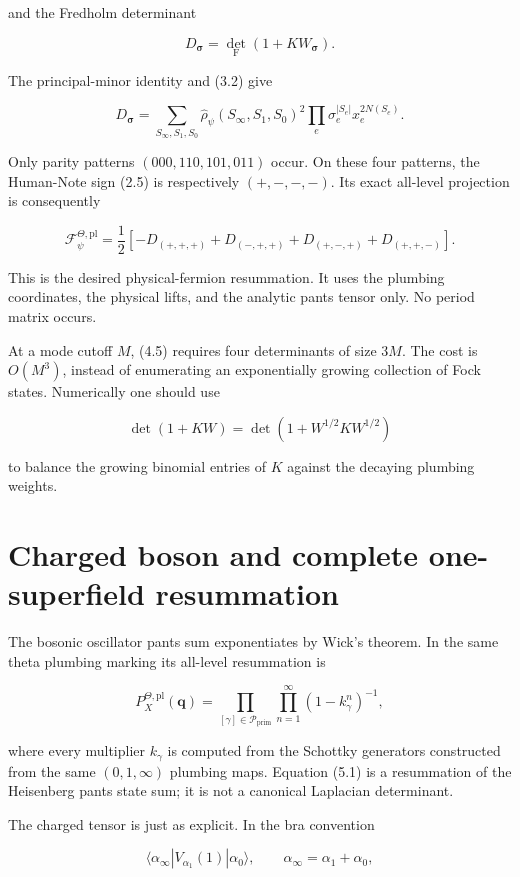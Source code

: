 \documentclass[11pt]{article}
\begin{document}
and the Fredholm determinant

\[
 D_{\boldsymbol\sigma}
 =\det_{\mathrm F}(1+K W_{\boldsymbol\sigma}).
\tag{4.3}
\]

The principal-minor identity and (3.2) give

\[
 D_{\boldsymbol\sigma}
 =\sum_{S_\infty,S_1,S_0}
   \widehat\rho_\psi(S_\infty,S_1,S_0)^2
   \prod_e\sigma_e^{|S_e|}
   x_e^{2N(S_e)}.
\tag{4.4}
\]

Only parity patterns \((000,110,101,011)\) occur.  On these four patterns,
the Human-Note sign (2.5) is respectively \((+,-,-,-)\).  Its exact
all-level projection is consequently

\[
\boxed{
 \mathcal F_{\psi}^{\Theta,\mathrm{pl}}
 =\frac12\left[
 -D_{(+,+,+)}
 +D_{(-,+,+)}
 +D_{(+,-,+)}
 +D_{(+,+,-)}
 \right].}
\tag{4.5}
\]

This is the desired physical-fermion resummation.  It uses the plumbing
coordinates, the physical lifts, and the analytic pants tensor only.  No
period matrix occurs.

At a mode cutoff \(M\), (4.5) requires four determinants of size \(3M\).
The cost is \(O(M^3)\), instead of enumerating an exponentially growing
collection of Fock states.  Numerically one should use

\[
 \det(1+KW)=\det(1+W^{1/2}KW^{1/2})
\tag{4.6}
\]

to balance the growing binomial entries of \(K\) against the decaying
plumbing weights.

\section{Charged boson and complete one-superfield resummation}

The bosonic oscillator pants sum exponentiates by Wick's theorem.  In the
same theta plumbing marking its all-level resummation is

\[
 P_X^{\Theta,\mathrm{pl}}(\mathbf q)
 =\prod_{[\gamma]\in\mathcal P_{\mathrm{prim}}}
   \prod_{n=1}^{\infty}(1-k_\gamma^n)^{-1},
\tag{5.1}
\]

where every multiplier \(k_\gamma\) is computed from the Schottky generators
constructed from the same \((0,1,\infty)\) plumbing maps.  Equation (5.1) is a
resummation of the Heisenberg pants state sum; it is not a canonical
Laplacian determinant.

The charged tensor is just as explicit.  In the bra convention

\[
 \langle\alpha_\infty|V_{\alpha_1}(1)|\alpha_0\rangle,
 \qquad \alpha_\infty=\alpha_1+\alpha_0,
\]
\end{document}

